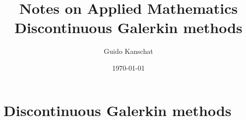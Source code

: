\documentclass[USenglish,12pt]{report}
\title{\textbf{Notes on Applied Mathematics}
\\[5mm]
{\large Discontinuous Galerkin methods}}
\author{Guido Kanschat}
\date{\today}
\begin{document}
\maketitle

\chapter{Discontinuous Galerkin methods}


\end{document}

